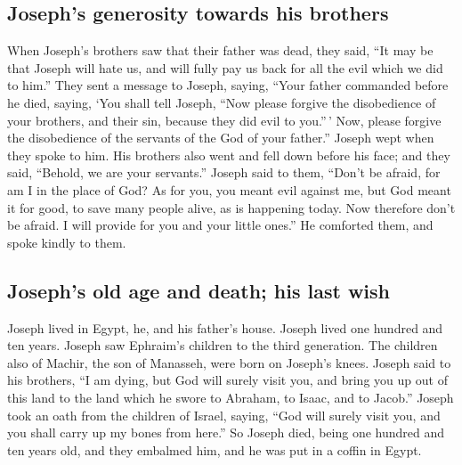 \hypertarget{josephs-generosity-towards-his-brothers}{%
\subsection{Joseph's generosity towards his
brothers}\label{josephs-generosity-towards-his-brothers}}

 When Joseph's brothers saw that their father was dead,
they said, ``It may be that Joseph will hate us, and will fully pay us
back for all the evil which we did to him.''  They sent a
message to Joseph, saying, ``Your father commanded before he died,
saying,  `You shall tell Joseph, ``Now please forgive the
disobedience of your brothers, and their sin, because they did evil to
you.''\,' Now, please forgive the disobedience of the servants of the
God of your father.'' Joseph wept when they spoke to him.
 His brothers also went and fell down before his face;
and they said, ``Behold, we are your servants.''  Joseph
said to them, ``Don't be afraid, for am I in the place of God?
 As for you, you meant evil against me, but God meant it
for good, to save many people alive, as is happening today.
 Now therefore don't be afraid. I will provide for you
and your little ones.'' He comforted them, and spoke kindly to them.

\hypertarget{josephs-old-age-and-death-his-last-wish}{%
\subsection{Joseph's old age and death; his last
wish}\label{josephs-old-age-and-death-his-last-wish}}

 Joseph lived in Egypt, he, and his father's house.
Joseph lived one hundred and ten years.  Joseph saw
Ephraim's children to the third generation. The children also of Machir,
the son of Manasseh, were born on Joseph's knees.  Joseph
said to his brothers, ``I am dying, but God will surely visit you, and
bring you up out of this land to the land which he swore to Abraham, to
Isaac, and to Jacob.''  Joseph took an oath from the
children of Israel, saying, ``God will surely visit you, and you shall
carry up my bones from here.''  So Joseph died, being one
hundred and ten years old, and they embalmed him, and he was put in a
coffin in Egypt.
